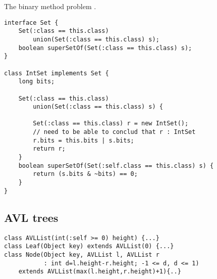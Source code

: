 The binary method problem \cite{bruce-binary}.

{\footnotesize
\begin{verbatim}
interface Set {
    Set(:class == this.class)
        union(Set(:class == this.class) s);
    boolean superSetOf(Set(:class == this.class) s);
}

class IntSet implements Set {
    long bits;

    Set(:class == this.class)
        union(Set(:class == this.class) s) {

        Set(:class == this.class) r = new IntSet();
        // need to be able to conclud that r : IntSet
        r.bits = this.bits | s.bits;
        return r;
    }
    boolean superSetOf(Set(:self.class == this.class) s) {
        return (s.bits & ~bits) == 0;
    }
}
\end{verbatim}}

\subsection{AVL trees}

{\footnotesize
\begin{verbatim}
class AVLList(int(:self >= 0) height) {...}
class Leaf(Object key) extends AVLList(0) {...}
class Node(Object key, AVLList l, AVLList r
           : int d=l.height-r.height; -1 <= d, d <= 1) 
    extends AVLList(max(l.height,r.height)+1){..}
\end{verbatim}}



